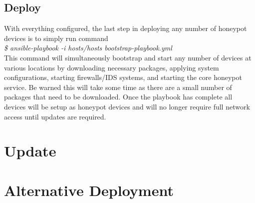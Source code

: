 
\subsection{Deploy}
With everything configured, the last step in deploying any number of honeypot devices is to simply run command
\\\newline
\textit{\$ ansible-playbook -i hosts/hosts bootstrap-playbook.yml}
\\\newline
This command will simultaneously bootstrap and start any number of devices at various locations by downloading necessary packages, applying system configurations, starting firewalls/IDS systems, and starting the core honeypot service. Be warned this will take some time as there are a small number of packages that need to be downloaded. Once the playbook has complete all devices will be setup as honeypot devices and will no longer require full network access until updates are required.

\section{Update}

\section{Alternative Deployment}
